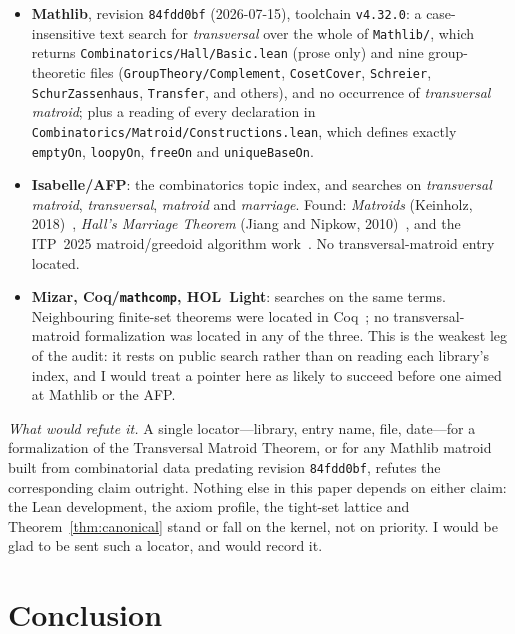 \documentclass[11pt]{article}
\newcommand{\lean}[1]{\texttt{#1}}
\begin{document}
\begin{itemize}\itemsep2pt
\item \textbf{Mathlib}, revision \lean{84fdd0bf} (2026-07-15), toolchain \lean{v4.32.0}: a
case-insensitive text search for \emph{transversal} over the whole of \lean{Mathlib/}, which
returns \lean{Combinatorics/Hall/Basic.lean} (prose only) and nine group-theoretic files
(\lean{GroupTheory/Complement}, \lean{CosetCover}, \lean{Schreier}, \lean{SchurZassenhaus},
\lean{Transfer}, and others), and no occurrence of \emph{transversal matroid}; plus a reading of
every declaration in \lean{Combinatorics/Matroid/Constructions.lean}, which defines exactly
\lean{emptyOn}, \lean{loopyOn}, \lean{freeOn} and \lean{uniqueBaseOn}.
\item \textbf{Isabelle/AFP}: the combinatorics topic index, and searches on \emph{transversal
matroid}, \emph{transversal}, \emph{matroid} and \emph{marriage}. Found: \emph{Matroids}
(Keinholz, 2018)~\cite{afpmatroids}, \emph{Hall's Marriage Theorem} (Jiang and Nipkow,
2010)~\cite{afphall}, and the ITP~2025 matroid/greedoid algorithm work~\cite{itp2025}. No
transversal-matroid entry located.
\item \textbf{Mizar, Coq/\lean{mathcomp}, HOL~Light}: searches on the same terms. Neighbouring
finite-set theorems were located in Coq~\cite{coqdilworth}; no transversal-matroid formalization
was located in any of the three. This is the weakest leg of the audit: it rests on public search
rather than on reading each library's index, and I would treat a pointer here as likely to
succeed before one aimed at Mathlib or the AFP.
\end{itemize}

\emph{What would refute it.} A single locator---library, entry name, file, date---for a
formalization of the Transversal Matroid Theorem, or for any Mathlib matroid built from
combinatorial data predating revision \lean{84fdd0bf}, refutes the corresponding claim outright.
Nothing else in this paper depends on either claim: the Lean development, the axiom profile, the
tight-set lattice and Theorem~\ref{thm:canonical} stand or fall on the kernel, not on priority.
I would be glad to be sent such a locator, and would record it.

\section{Conclusion}\label{sec:conclusion}
\end{document}
